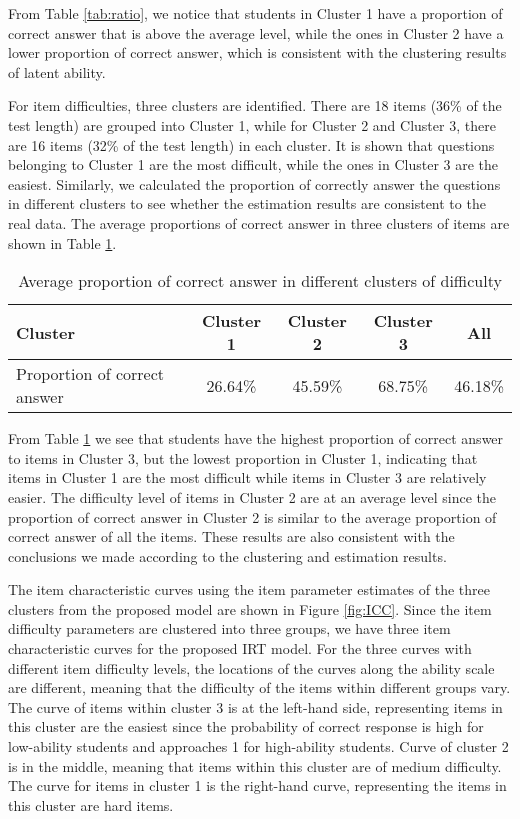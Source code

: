 \documentclass[12pt]{article}
\begin{document}
From Table \ref{tab:ratio}, we notice that students in Cluster 1 have a proportion of correct answer that is above the average level, while the ones in Cluster 2 have a lower proportion of correct answer, which is consistent with the clustering results of latent ability. 

For item difficulties, three clusters are identified. There are 18 items (36\% of the test length) are grouped into Cluster 1, while for Cluster 2 and Cluster 3, there are 16 items (32\% of the test length) in each cluster. It is shown that questions belonging to Cluster 1 are the most difficult, while the ones in Cluster 3 are the easiest. Similarly, we calculated the proportion of correctly answer the questions in different clusters to see whether the estimation results are consistent to the real data. The average proportions of correct answer in three clusters of items are shown in Table \ref{tab:ratio2}.


\begin{table}[h!]
	\centering
	\caption{Average proportion of correct answer in different clusters of difficulty}\label{tab:ratio2}
	\begin{tabular}{lcccc}
		\toprule
		Cluster  &  Cluster 1 & Cluster 2 & Cluster 3  &  All \\
		\midrule 
		Proportion of correct answer & 26.64\% & 45.59\% &  68.75\%& 46.18\%\\
		\bottomrule
	\end{tabular}
\end{table} 

From Table \ref{tab:ratio2} we see that students have the highest proportion of correct answer to items in Cluster 3, but the lowest proportion in Cluster 1, indicating that items in Cluster 1 are the most difficult while items in Cluster 3 are relatively easier. The difficulty level of items in Cluster 2 are at an average level since the proportion of correct answer in Cluster 2 is similar to the average proportion of correct answer of all the items. These results are also consistent with the conclusions we made according to the clustering and estimation results. 


The item characteristic curves using the item parameter estimates of the three clusters from the proposed model are shown in Figure \ref{fig:ICC}.
Since the item difficulty parameters are clustered into three groups, we have three item characteristic curves for the proposed IRT model. For the three curves with different item difficulty levels, the locations of the curves along the ability scale are different, meaning that the difficulty of the items within different groups vary. The curve of items within cluster 3 is at the left-hand side, representing items in this cluster are the easiest since the probability of correct response is high for low-ability students and approaches 1 for high-ability students. Curve of cluster 2 is in the middle, meaning that items within this cluster are of medium difficulty. The curve for items in cluster 1 is the right-hand curve, representing the items in this cluster are hard items. 
\end{document}
